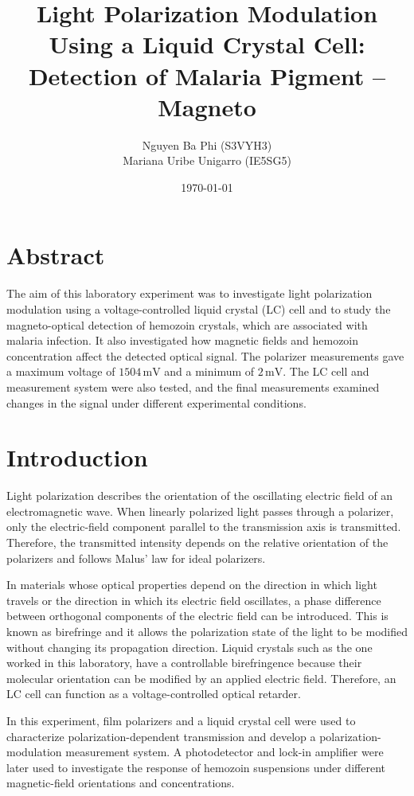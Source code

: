 \documentclass[12pt,a4paper]{article}
\title{\textbf{Light Polarization Modulation Using a Liquid Crystal Cell:}\\
Detection of Malaria Pigment -- Magneto}
\author{
Nguyen Ba Phi (S3VYH3)\\
Mariana Uribe Unigarro (IE5SG5)
}
\date{\today}
\begin{document}
\maketitle





\section{Abstract}
The aim of this laboratory experiment was to investigate light
polarization modulation using a voltage-controlled liquid crystal
(LC) cell and to study the magneto-optical detection of hemozoin
crystals, which are associated with malaria infection. It also
investigated how magnetic fields and hemozoin concentration affect
the detected optical signal. The polarizer measurements gave a
maximum voltage of \(1504\,\mathrm{mV}\) and a minimum of
\(2\,\mathrm{mV}\). The LC cell and measurement system were also
tested, and the final measurements examined changes in the signal
under different experimental conditions.







\section{Introduction}

Light polarization describes the orientation of the oscillating
electric field of an electromagnetic wave. When linearly polarized
light passes through a polarizer, only the electric-field component
parallel to the transmission axis is transmitted. Therefore,
the transmitted intensity depends on the relative orientation of
the polarizers and follows Malus' law for ideal polarizers.

In materials whose optical properties depend on the direction in which light travels or the direction in which its electric field oscillates, a phase difference between orthogonal components of the electric field can be introduced. This is known as birefringe and it allows the polarization state of the light to be modified without changing its propagation direction. Liquid crystals such as the one worked in this laboratory, have a controllable birefringence because their molecular orientation can be modified
by an applied electric field. Therefore, an LC cell can function
as a voltage-controlled optical retarder.

In this experiment, film polarizers and a liquid crystal cell
were used to characterize polarization-dependent transmission
and develop a polarization-modulation measurement system. A
photodetector and lock-in amplifier were later used to
investigate the response of hemozoin suspensions under different
magnetic-field orientations and concentrations.
\end{document}
